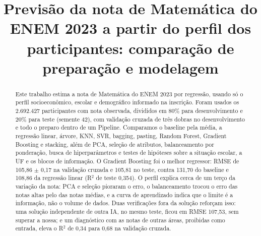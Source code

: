 \documentclass[conference,a4paper]{IEEEtran}
\begin{document}
\title{Previsão da nota de Matemática do ENEM 2023 a partir do perfil dos participantes: comparação de preparação e modelagem}

\author{
\and
{}
\and
{}
\and
{}
}

\maketitle

\begin{abstract}
Este trabalho estima a nota de Matemática do ENEM 2023 por regressão, usando só o perfil socioeconômico, escolar e demográfico informado na inscrição. Foram usados os 2.692.427 participantes com nota observada, divididos em 80\% para desenvolvimento e 20\% para teste (semente 42), com validação cruzada de três dobras no desenvolvimento e todo o preparo dentro de um Pipeline. Comparamos o baseline pela média, a regressão linear, árvore, KNN, SVR, bagging, pasting, Random Forest, Gradient Boosting e stacking, além de PCA, seleção de atributos, balanceamento por ponderação, busca de hiperparâmetros e testes de hipóteses sobre a situação escolar, a UF e os blocos de informação. O Gradient Boosting foi o melhor regressor: RMSE de 105,86 $\pm$ 0,17 na validação cruzada e 105,81 no teste, contra 131,70 do baseline e 108,86 da regressão linear (R$^2$ de teste 0,354). O perfil explica cerca de um terço da variação da nota: PCA e seleção pioraram o erro, o balanceamento trocou o erro das notas altas pelo das notas médias, e a curva de aprendizado indica que o limite é a informação, não o volume de dados. Duas verificações fora da solução reforçam isso: uma solução independente de outra IA, no mesmo teste, ficou em RMSE 107,53, sem superar a nossa; e um diagnóstico com as notas de outras áreas, proibidas como entrada, eleva o R$^2$ de 0,34 para 0,68 na validação cruzada.
\end{abstract}
\end{document}
